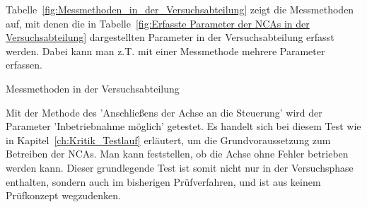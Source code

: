 Tabelle~\ref{fig:Messmethoden_in_der_Versuchsabteilung} zeigt die Messmethoden auf, mit denen die in Tabelle~\ref{fig:Erfasste Parameter der NCAs in der Versuchsabteilung} dargestellten Parameter in der Versuchsabteilung erfasst werden. Dabei kann man z.T. mit einer Messmethode mehrere Parameter erfassen. 




\begin{table}[h]
\center
{}
\caption{Messmethoden in der Versuchsabteilung}
\label{fig:Messmethoden_in_der_Versuchsabteilung}
\end{table}




Mit der Methode des 'Anschließens der Achse an die Steuerung' wird der Parameter 'Inbetriebnahme möglich' getestet. Es handelt sich bei diesem Test wie in Kapitel~\ref{ch:Kritik_Testlauf} erläutert, um die Grundvoraussetzung zum Betreiben der NCAs. Man kann feststellen, ob die Achse ohne Fehler betrieben werden kann. Dieser grundlegende Test ist somit nicht nur in der Ver\-suchs\-pha\-se enthalten, sondern auch im bisherigen Prüfverfahren, und ist aus keinem Prüfkonzept wegzudenken.



